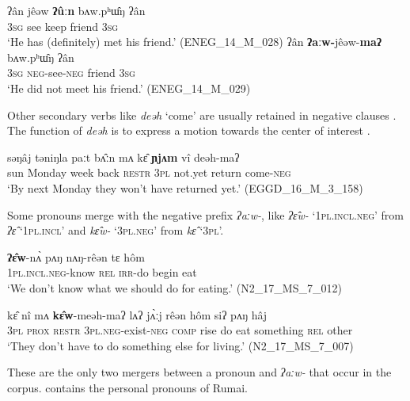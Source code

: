 \documentclass[output=paper,colorlinks,citecolor=brown]{langscibook}
\begin{document}
\ea\label{ex:rum:18}
    \ea\label{ex:rum:18a}
        \gll ʔân	jêəw	\textbf{ʔûːn}	bʌw.pʰɯ̂ŋ	ʔân \\ 
             3\textsc{sg} see keep friend 3\textsc{sg} \\
        \glt ‘He has (definitely) met his friend.’ (ENEG\_14\_M\_028)
    \ex\label{ex:rum:18b}
        \gll ʔân	\textbf{ʔaːw-}jêəw-\textbf{maʔ}	bʌw.pʰɯ̂ŋ	ʔân \\
             3\textsc{sg} \textsc{neg}{}-see-\textsc{neg} friend 3\textsc{sg} \\
        \glt ‘He did not meet his friend.’ (ENEG\_14\_M\_029)
    \z
\z 

Other secondary verbs like \textit{deəh} ‘come’ are usually retained in negative clauses . The function of \textit{deəh} is to express a motion towards the center of interest \citep[173]{Jenny2005}.

\ea\label{ex:rum:19}
    \gll səŋâj	təniŋla	paːt	bʌ̂ːn	mʌ	kɛ̂	\textbf{ɲjʌm}	vî	deəh-maʔ \\
         sun Monday week back \textsc{restr} 3\textsc{pl} not.yet return come{}-\textsc{neg} \\
    \glt ‘By next Monday they won’t have returned yet.’ (EGGD\_16\_M\_3\_158)
\z 

Some pronouns merge with the negative prefix \textit{ʔaːw-}, like \textit{ʔɛ̂w-} ‘\textsc{1pl.incl.neg}’  from \textit{ʔɛ̂} ‘\textsc{1pl.incl}’ and \textit{kɛ̂w-} ‘\textsc{3pl.neg}’  from \textit{kɛ̂} ‘\textsc{3pl}’.

\ea\label{ex:rum:20}
    \gll \textbf{ʔɛ̂w}-nʌ̀	pʌŋ	nʌŋ-rêən	tɛ	hôm \\
         1\textsc{pl.incl.neg}{}-know \textsc{rel} \textsc{irr}{}-do begin eat \\
    \glt  ‘We don't know what we should do for eating.’ (N2\_17\_MS\_7\_012)
\z 

\ea\label{ex:rum:21}
    \gll kɛ̂	nî	mʌ	\textbf{kɛ̂w}-meəh-maʔ	lʌʔ	jʌ̀ːj	rêən	hôm	siʔ	pʌŋ	hâj \\
         3\textsc{pl} \textsc{prox} \textsc{restr} \textsc{3pl.neg}{}-exist{}-\textsc{neg} \textsc{comp} rise do eat something \textsc{rel} other \\
    \glt ‘They don't have to do something else for living.’ (N2\_17\_MS\_7\_007)
\z
 
These are the only two mergers between a pronoun and \textit{ʔaːw-} that occur in the corpus.  contains the personal pronouns of Rumai.
\end{document}
